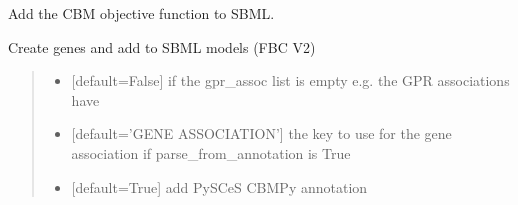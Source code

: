 \documentclass[letterpaper,12pt,english]{sphinxmanual}
\begin{document}
\begin{fulllineitems}

\begin{fulllineitems}
\label{\detokenize{api/io:cbmpy.CBXML.CBMtoSBML3.addObjectives}}
\pysigstartsignatures
\pysiglinewithargsret
{}
{}
{}
\pysigstopsignatures
\sphinxAtStartPar
Add the CBM objective function to SBML.

\end{fulllineitems}


\begin{fulllineitems}
\label{\detokenize{api/io:cbmpy.CBXML.CBMtoSBML3.addGenesV2}}
\pysigstartsignatures
\pysiglinewithargsret
{}
{\sphinxparamcomma {}\sphinxparamcomma {}}
{}
\pysigstopsignatures
\sphinxAtStartPar
Create genes and add to SBML models (FBC V2)
\begin{quote}\begin{description}
\begin{itemize}
\item {} 
\sphinxAtStartPar
{} \textendash{} {[}default=False{]} if the gpr\_assoc list is empty e.g. the GPR associations have

\item {} 
\sphinxAtStartPar
{} \textendash{} {[}default=’GENE ASSOCIATION’{]} the key to use for the gene association if parse\_from\_annotation is True

\item {} 
\sphinxAtStartPar
{} \textendash{} {[}default=True{]} add PySCeS CBMPy annotation

\end{itemize}


\end{description}
\end{quote}
\end{fulllineitems}
\end{fulllineitems}
\end{document}
